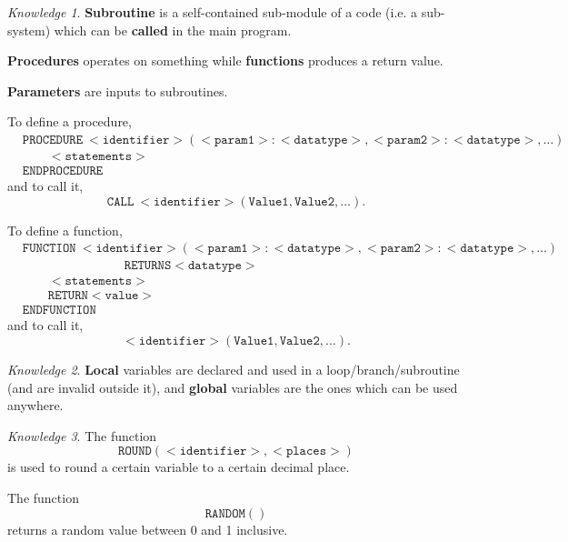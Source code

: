 \documentclass[8pt]{article}
\theoremstyle{remark}
\newtheorem{knowledge}{Knowledge}[subsection]
\begin{document}
            \begin{knowledge}
                \textbf{Subroutine} is a self-contained sub-module of a code (i.e. a sub-system) which can be \textbf{called} in the main program.
                
                \textbf{Procedures} operates on something while \textbf{functions} produces a return value.
                
                \textbf{Parameters} are inputs to subroutines.

                To define a procedure,
                \begin{align*}
                    &\mathtt{PROCEDURE\ <identifier> (<param1>: <datatype>, <param2>:<datatype>, \ldots)}\\
                    &\qquad \mathtt{<statements>}\\
                    &\mathtt{ENDPROCEDURE}
                \end{align*}
                and to call it,
                \[
                    \mathtt{CALL\ <identifier> (Value1, Value2, \ldots)}.
                \]

                To define a function,
                \begin{align*}
                    &\mathtt{FUNCTION\ <identifier> (<param1>: <datatype>, <param2>:<datatype>, \ldots)}\\
                    &\qquad \qquad \qquad \qquad \mathtt{RETURNS <datatype>}\\
                    &\qquad \mathtt{<statements>}\\
                    &\qquad \mathtt{RETURN <value>}\\
                    &\mathtt{ENDFUNCTION}
                \end{align*}
                and to call it,
                \[
                    \mathtt{<identifier> (Value1, Value2, \ldots)}.
                \]

            \end{knowledge}

            \begin{knowledge}
                \textbf{Local} variables are declared and used in a loop/branch/subroutine (and are invalid outside it), and \textbf{global} variables are the ones which can be used anywhere.
            \end{knowledge}

            \begin{knowledge}
                The function
                \[
                    \mathtt{ROUND(<identifier>, <places>)}
                \]
                is used to round a certain variable to a certain decimal place.

                The function
                \[
                    \mathtt{RANDOM()}
                \]
                returns a random value between 0 and 1 inclusive.
            \end{knowledge}
            
\end{document}
